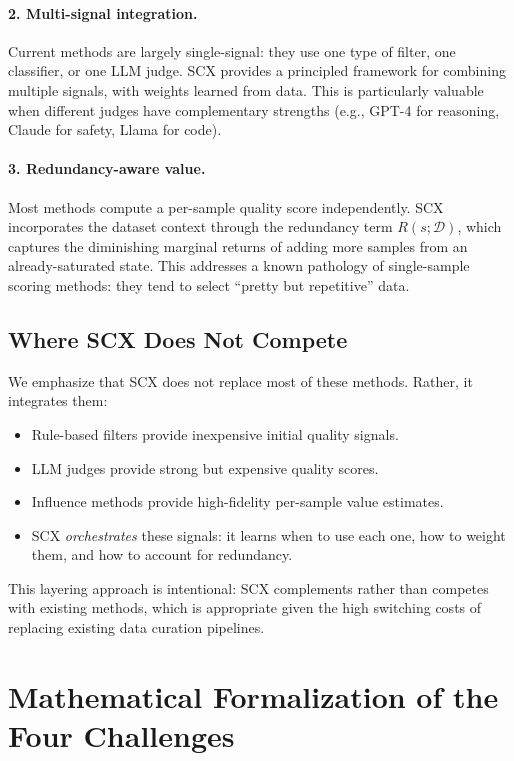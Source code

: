 \documentclass[11pt]{article}
\begin{document}
\paragraph{2. Multi-signal integration.}
Current methods are largely single-signal: they use one type of filter, one classifier, or one LLM judge. SCX provides a principled framework for combining multiple signals, with weights learned from data. This is particularly valuable when different judges have complementary strengths (e.g., GPT-4 for reasoning, Claude for safety, Llama for code).

\paragraph{3. Redundancy-aware value.}
Most methods compute a per-sample quality score independently. SCX incorporates the dataset context through the redundancy term $R(s; \mathcal{D})$, which captures the diminishing marginal returns of adding more samples from an already-saturated state. This addresses a known pathology of single-sample scoring methods: they tend to select ``pretty but repetitive'' data.

\subsection{Where SCX Does Not Compete}

We emphasize that SCX does not replace most of these methods. Rather, it integrates them:
\begin{itemize}
    \item Rule-based filters provide inexpensive initial quality signals.
    \item LLM judges provide strong but expensive quality scores.
    \item Influence methods provide high-fidelity per-sample value estimates.
    \item SCX \textit{orchestrates} these signals: it learns when to use each one, how to weight them, and how to account for redundancy.
\end{itemize}

This layering approach is intentional: SCX complements rather than competes with existing methods, which is appropriate given the high switching costs of replacing existing data curation pipelines.

\section{Mathematical Formalization of the Four Challenges}
\end{document}
